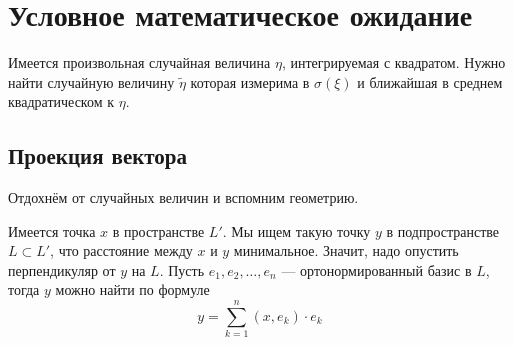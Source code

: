 \section{Условное математическое ожидание}
Имеется произвольная случайная величина $\eta$, интегрируемая с квадратом.
Нужно найти случайную величину $\tilde{\eta}$ которая
измерима в $\sigma\left( \xi \right)$
и ближайшая в среднем квадратическом к $\eta$.

\subsection{Проекция вектора}
Отдохнём от случайных величин и вспомним геометрию.

Имеется точка $x$ в пространстве $L'$.
Мы ищем такую точку $y$ в подпространстве $L\subset L'$,
что расстояние между $x$ и $y$ минимальное.
Значит, надо опустить перпендикуляр от $y$ на $L$.
Пусть $e_1, e_2, \dots, e_n$ --- ортонормированный базис в $L$,
тогда $y$ можно найти по формуле
\begin{equation}\label{vectorProjection}
  y = \sum_{k=1}^n \left( x, e_k \right) \cdot e_k
\end{equation}
\begin{comment}
Потому что $y \in L$ должен лежать в пространстве $L$ по условию,
а это значит, что он должен быть линейной комбинацией базисных векторов
$e_1, e_2, \dots, e_n$ и это очевидно выполняется

Также разностью $x-y$ должен быть вектор, перпендикулярный пространству $L$.
То есть скалярное произведение этой разности с любым вектором $z$
из пространства $L$ должно равняться нулю
$$\left( x-y \right) \perp L
  \Leftrightarrow \forall z \in L:
  \left( x-y,z \right)=0$$

Вследствие линейности скалярного произведения можно переписать это условие иначе
\begin{align*}
  \begin{cases}
      \forall z \in L: \left( x-y,z \right)=0\\
      \left( a+b,c \right)= \left( a,c \right)+ \left( b,c \right)
  \end{cases}
  \Rightarrow \forall z \in L: \left( x,z \right)= \left( y,z \right)
\end{align*}

Покажем, что и это выполняется.
$z$ является линейной комбинацией базисных векторов. Запишем это
$$z = \sum_{k=1}^n \beta_k \cdot e_k$$

В таком случае скалярное произведение $\left( x,z \right)$ будет таким
$$\left( x,z \right)= \sum_{k=1}^n \beta_k \cdot \left( x,e_k \right)$$

С произведением $\left( y,x \right)$ придётся чуть-чуть повозиться
$$\left( y,x \right)
  = \left( \sum_{k=1}^n\left( x,e_k \right)\cdot e_k,
      \sum_{k=1}^n \beta_k \cdot e_k \right)
  = \sum_{k=1}^n \left( x,e_k \right)\cdot \beta_k$$

Как видим, суммы равны, а значит, проекция $x$ на $L$ найдена верно.
\end{comment}


